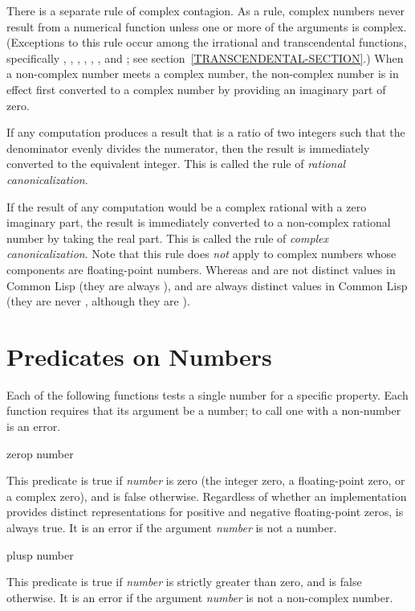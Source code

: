 There is a separate rule of complex contagion.
As a rule, complex numbers never result from a numerical function
unless one or more of the
arguments is complex.  (Exceptions to this
rule occur among the irrational and transcendental functions,
specifically , , ,
, , , and ;
see section~\ref{TRANSCENDENTAL-SECTION}.)
When a non-complex number meets a complex number, the non-complex
number is in effect first converted to a complex number by providing an
imaginary part of zero.

If any computation produces a result that is a ratio of
two integers such that the denominator evenly divides the
numerator, then the result is immediately converted to the equivalent
integer.  This is called the rule of {\it rational canonicalization}.

If the result of any computation would be a complex rational
with a zero imaginary part, the result is immediately
converted to a non-complex rational number by taking the
real part.  This is called the rule of {\it complex canonicalization}.
Note that this rule does {\it not} apply to complex numbers whose components
are floating-point numbers.  Whereas  and  are not
distinct values in Common Lisp (they are always ),
 and  are always distinct values in Common Lisp
(they are never , although they are ).

\section{Predicates on Numbers}

Each of the following functions tests a single number for
a specific property.
Each function requires that its argument be
a number; to call one with a non-number is an error.

\begin{defun}[Function]
zerop number

This predicate is true if {\it number} is zero (the integer zero,
a floating-point zero, or a complex zero), and is false otherwise.
Regardless of whether an implementation provides distinct representations
for positive and negative floating-point zeros,
 is always true.
It is an error if the argument {\it number} is not a number.
\end{defun}

\begin{defun}[Function]
plusp number

This predicate is true if {\it number} is strictly greater than zero,
and is false otherwise.
It is an error if the argument {\it number} is not a non-complex number.
\end{defun}

